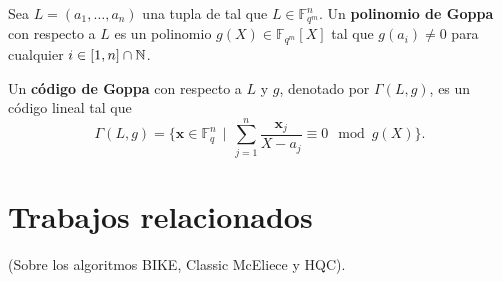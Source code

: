 \begin{definition}
	Sea $L = (a_1, \dots, a_n)$ una tupla de tal que $L \in \mathbb{F}_{q^m}^n$. Un \textbf{polinomio de Goppa} con respecto a $L$ es un polinomio $g(X) \in \mathbb{F}_{q^m}[X]$ tal que $g(a_i) \neq 0$ para cualquier $i \in [1, n] \cap \mathbb{N}$.
\end{definition}

\begin{definition}
	Un \textbf{código de Goppa} con respecto a $L$ y $g$, denotado por $\Gamma(L, g)$, es un código lineal tal que
	\[\Gamma(L, g) = \bigg\{\textbf{x} \in \mathbb{F}_q^n \ \ \bigg|\ \ \sum_{j=1}^n \frac{\textbf{x}_j}{X - a_j} \equiv 0 \mod g(X)\bigg\}.\]
\end{definition}

\section{Trabajos relacionados}

(Sobre los algoritmos BIKE, Classic McEliece y HQC).
